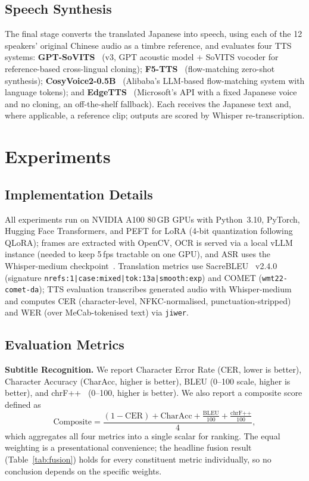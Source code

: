 \documentclass[mathematics,article,submit,xetex,moreauthors]{Definitions/mdpi}
\begin{document}
\subsection{Speech Synthesis}
\label{sec:tts}
The final stage converts the translated Japanese into speech, using each of the 12 speakers' original Chinese audio as a timbre reference, and evaluates four TTS systems:
\textbf{GPT-SoVITS}~\cite{gptsovits2024} (v3, GPT acoustic model + SoVITS vocoder for reference-based cross-lingual cloning);
\textbf{F5-TTS}~\cite{chen2024f5tts} (flow-matching zero-shot synthesis);
\textbf{CosyVoice2-0.5B}~\cite{cosyvoice2_2024} (Alibaba's LLM-based flow-matching system with language tokens); and
\textbf{EdgeTTS}~\cite{edgetts2024} (Microsoft's API with a fixed Japanese voice and no cloning, an off-the-shelf fallback).
Each receives the Japanese text and, where applicable, a reference clip; outputs are scored by Whisper re-transcription.

\section{Experiments}
\label{sec:experiments}

\subsection{Implementation Details}
All experiments run on NVIDIA A100 80\,GB GPUs with Python~3.10, PyTorch, Hugging Face Transformers, and PEFT for LoRA (4-bit quantization following QLoRA); frames are extracted with OpenCV, OCR is served via a local vLLM instance (needed to keep 5\,fps tractable on one GPU), and ASR uses the Whisper-medium checkpoint~\cite{radford2023robust}.
Translation metrics use SacreBLEU~\cite{post2018sacrebleu} v2.4.0 (signature \texttt{nrefs:1|\allowbreak case:mixed|\allowbreak tok:13a|\allowbreak smooth:exp}) and COMET (\texttt{wmt22-comet-da}); TTS evaluation transcribes generated audio with Whisper-medium and computes CER (character-level, NFKC-normalised, punctuation-stripped) and WER (over MeCab-tokenised text) via \texttt{jiwer}.

\subsection{Evaluation Metrics}
\label{sec:metrics}
\textbf{Subtitle Recognition.} We report Character Error Rate (CER, lower is better), Character Accuracy (CharAcc, higher is better), BLEU (0--100 scale, higher is better), and chrF++~\cite{popovic2015chrf} (0--100, higher is better).
We also report a composite score defined as
\begin{equation}
\text{Composite} = \frac{(1 - \text{CER}) + \text{CharAcc} + \frac{\text{BLEU}}{100} + \frac{\text{chrF++}}{100}}{4},
\label{eq:composite}
\end{equation}
which aggregates all four metrics into a single scalar for ranking.
The equal weighting is a presentational convenience; the headline fusion result (Table~\ref{tab:fusion}) holds for every constituent metric individually, so no conclusion depends on the specific weights.
\end{document}

